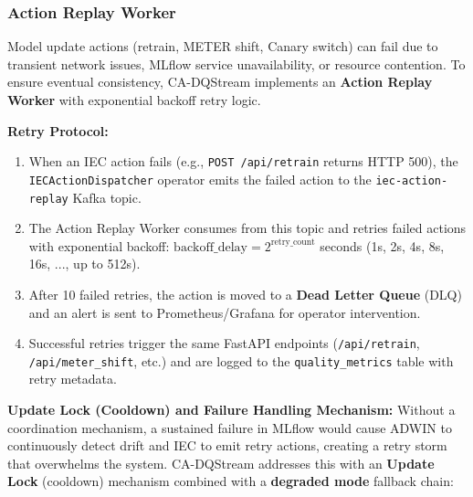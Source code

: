 \subsubsection{Action Replay Worker}

Model update actions (retrain, METER shift, Canary switch) can fail due to transient network issues, MLflow service unavailability, or resource contention. To ensure eventual consistency, CA-DQStream implements an \textbf{Action Replay Worker} with exponential backoff retry logic.

\textbf{Retry Protocol:}

\begin{enumerate}
    \item When an IEC action fails (e.g., \texttt{POST /api/retrain} returns HTTP 500), the \texttt{IECActionDispatcher} operator emits the failed action to the \texttt{iec-action-replay} Kafka topic.

    \item The Action Replay Worker consumes from this topic and retries failed actions with exponential backoff: $\text{backoff\_delay} = 2^{\text{retry\_count}}$ seconds (1s, 2s, 4s, 8s, 16s, ..., up to 512s).

    \item After 10 failed retries, the action is moved to a \textbf{Dead Letter Queue} (DLQ) and an alert is sent to Prometheus/Grafana for operator intervention.

    \item Successful retries trigger the same FastAPI endpoints (\texttt{/api/retrain}, \texttt{/api/meter\_shift}, etc.) and are logged to the \texttt{quality\_metrics} table with retry metadata.
\end{enumerate}

\textbf{Update Lock (Cooldown) and Failure Handling Mechanism:} Without a coordination mechanism, a sustained failure in MLflow would cause ADWIN to continuously detect drift and IEC to emit retry actions, creating a retry storm that overwhelms the system. CA-DQStream addresses this with an \textbf{Update Lock} (cooldown) mechanism combined with a \textbf{degraded mode} fallback chain:

